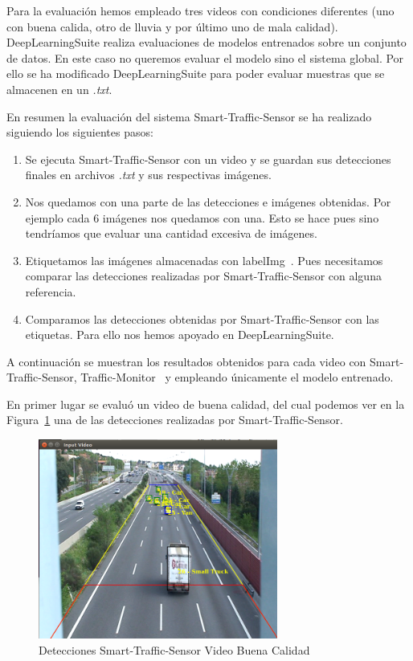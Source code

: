 Para la evaluación hemos empleado tres videos con condiciones diferentes (uno con buena calida, otro de lluvia y por último uno de mala calidad). DeepLearningSuite realiza evaluaciones de modelos entrenados sobre un conjunto de datos. En este caso no queremos evaluar el modelo sino el sistema global. Por ello se ha modificado DeepLearningSuite para poder evaluar muestras que se almacenen en un \textit{.txt}. 

En resumen la evaluación del sistema Smart-Traffic-Sensor se ha realizado siguiendo los siguientes pasos:

\begin{enumerate}
    \item Se ejecuta Smart-Traffic-Sensor con un video y se guardan sus detecciones finales en archivos \textit{.txt} y sus respectivas imágenes.
    \item Nos quedamos con una parte de las detecciones e imágenes obtenidas. Por ejemplo cada 6 imágenes nos quedamos con una. Esto se hace pues sino tendríamos que evaluar una cantidad excesiva de imágenes.
    \item Etiquetamos las imágenes almacenadas con labelImg~\cite{labelimg}. Pues necesitamos comparar las detecciones realizadas por Smart-Traffic-Sensor con alguna referencia.
    \item Comparamos las detecciones obtenidas por Smart-Traffic-Sensor con las etiquetas. Para ello nos hemos apoyado en DeepLearningSuite.
\end{enumerate}


A continuación se muestran los resultados obtenidos para cada video con Smart-Traffic-Sensor, Traffic-Monitor~\cite{redo_tesis} y empleando únicamente el modelo entrenado.

En primer lugar se evaluó un video de buena calidad, del cual podemos ver en la Figura~\ref{fig.video_buena_calidad} una de las detecciones realizadas por Smart-Traffic-Sensor.

\begin{figure}[H] 
\begin{center}
	\includegraphics[width=0.7\textwidth]{figures/Experimentos/sts_buena.png}
   \caption{Detecciones Smart-Traffic-Sensor Video Buena Calidad}
	\label{fig.video_buena_calidad}
\end{center}
\end{figure}

